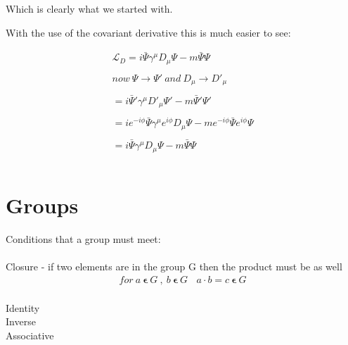 \documentclass[aps,secnumarabic,nobalancelastpage,amsmath,amssymb,
nofootinbib]{revtex4}
\newcommand{\Lagr}{\mathcal{L}}
\begin{document}
\noindent Which is clearly what we started with. 

\noindent With the use of the covariant derivative this is much easier to see:

\begin{equation}
\begin{split}
\Lagr_D = i \bar{\Psi} \gamma^\mu D_\mu \Psi - m \bar{\Psi} \Psi\\ \\
now \ \Psi \rightarrow \Psi' \ and \ D_\mu \rightarrow D'_\mu \\\\
 = i \bar{\Psi}' \gamma^\mu D'_\mu \Psi' - m \bar{\Psi}' \Psi'\\\\
=i e^{-i \phi} \bar{\Psi} \gamma^\mu e^{i \phi} D_\mu \Psi - m e^{-i \phi} \bar{\Psi} e^{i \phi} \Psi \\\\
= i \bar{\Psi} \gamma^\mu D_\mu \Psi - m \bar{\Psi} \Psi\\\\
\end{split}
\end{equation}



\section{Groups}

\noindent Conditions that a group must meet: \\\\
\indent Closure - if two elements are in the group G then the product must be as well \\    

\begin{equation} 
\begin{split}
for \ a \ \pmb \epsilon \ G \ , \  b \ 
\pmb \epsilon \ G \ \ \ \ 
a \cdot b = 
c \
\pmb \epsilon \ G \\ 
\end{split} 
\end{equation}

\indent Identity\\
\indent Inverse\\
\indent Associative\\
\end{document}
